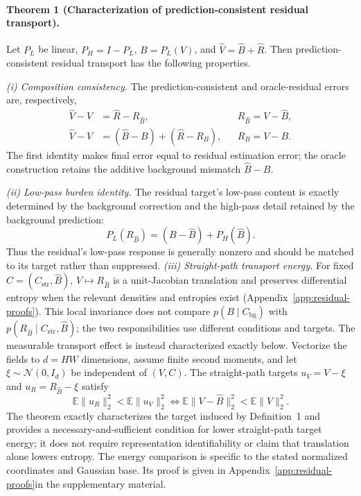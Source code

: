 \paragraph{Theorem 1 (Characterization of prediction-consistent residual transport).}
Let $P_L$ be linear, $P_H=I-P_L$, $B=P_L(V)$, and $\hat V=\hat B+\hat R$. Then prediction-consistent residual transport has the following properties.

\textit{(i) Composition consistency.}
The prediction-consistent and oracle-residual errors are, respectively,
\begin{equation}
\begin{aligned}
\hat V-V&=\hat R-R_{\hat B},
&&R_{\hat B}=V-\hat B,\\
\hat V-V&=(\hat B-B)+(\hat R-R_B),
&&R_B=V-B.
\end{aligned}
\label{eq:composition-consistent}
\end{equation}
The first identity makes final error equal to residual estimation error; the oracle construction retains the additive background mismatch $\hat B-B$.

\textit{(ii) Low-pass burden identity.}
The residual target's low-pass content is exactly determined by the background correction and the high-pass detail retained by the background prediction:
\begin{equation}
P_L(R_{\hat B})=(B-\hat B)+P_H(\hat B).
\label{eq:low-frequency-burden}
\end{equation}
Thus the residual's low-pass response is generally nonzero and should be matched to its target rather than suppressed.
\textit{(iii) Straight-path transport energy.}
For fixed $C=(C_{\mathrm{str}},\hat B)$, $V\mapsto R_{\hat B}$ is a unit-Jacobian translation and preserves differential entropy when the relevant densities and entropies exist (Appendix~\ref{app:residual-proofs}). This local invariance does not compare $p(B\mid C_{\mathrm{bg}})$ with $p(R_{\hat B}\mid C_{\mathrm{str}},\hat B)$; the two responsibilities use different conditions and targets. The measurable transport effect is instead characterized exactly below. Vectorize the fields to $d=HW$ dimensions, assume finite second moments, and let $\xi\sim\mathcal N(0,I_d)$ be independent of $(V,C)$. The straight-path targets $u_V=V-\xi$ and $u_R=R_{\hat B}-\xi$ satisfy
\begin{equation}
\mathbb E\|u_R\|_2^2<\mathbb E\|u_V\|_2^2
\iff
\mathbb E\|V-\hat B\|_2^2<\mathbb E\|V\|_2^2.
\label{eq:transport-condition}
\end{equation}
The theorem exactly characterizes the target induced by Definition~1 and provides a necessary-and-sufficient condition for lower straight-path target energy; it does not require representation identifiability or claim that translation alone lowers entropy. The energy comparison is specific to the stated normalized coordinates and Gaussian base. Its proof is given \ifaaaiwithappendix in Appendix~\ref{app:residual-proofs}\else in the supplementary material\fi.

